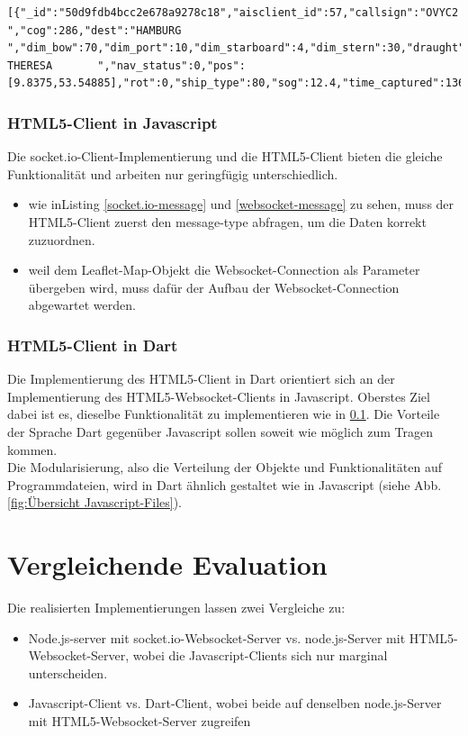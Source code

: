 \begin{lstlisting}[caption= vom socket.io-Server gesendete message, label=socket.io-message]
[{"_id":"50d9fdb4bcc2e678a9278c18","aisclient_id":57,"callsign":"OVYC2  ","cog":286,"dest":"HAMBURG             ","dim_bow":70,"dim_port":10,"dim_starboard":4,"dim_stern":30,"draught":54,"imo":"9363170","mmsi":220515000,"msgid":1,"name":"RIKKE THERESA       ","nav_status":0,"pos":[9.8375,53.54885],"rot":0,"ship_type":80,"sog":12.4,"time_captured":1366734056000,"time_received":1366734014715,"true_heading":288}]
\end{lstlisting}

\subsection{HTML5-Client in Javascript}\label{HTML5-Client in Javascript}
Die socket.io-Client-Implementierung und die HTML5-Client bieten die gleiche Funktionalität und arbeiten nur geringfügig unterschiedlich.
 \begin{itemize}
 \item wie inListing \ref{socket.io-message} und \ref{websocket-message} zu sehen, muss der HTML5-Client zuerst den message-type abfragen, um die Daten korrekt zuzuordnen.
 \item weil dem Leaflet-Map-Objekt die Websocket-Connection als Parameter übergeben wird, muss dafür der Aufbau der Websocket-Connection abgewartet werden. 
\end{itemize}

\subsection{HTML5-Client in Dart}\label{HTML5-Client in Dart}
Die Implementierung des HTML5-Client in Dart orientiert sich an der Implementierung des HTML5-Websocket-Clients in Javascript. Oberstes Ziel dabei ist es, dieselbe Funktionalität zu implementieren wie in \ref{HTML5-Client in Javascript}. Die Vorteile der Sprache Dart gegenüber Javascript sollen soweit wie möglich zum Tragen kommen. \\
Die Modularisierung, also die Verteilung der Objekte und Funktionalitäten auf Programmdateien, wird in Dart ähnlich gestaltet wie in Javascript (siehe Abb. \ref{fig:Übersicht Javascript-Files}).

\chapter{Vergleichende Evaluation}
Die realisierten Implementierungen lassen zwei Vergleiche zu: 
\begin{itemize}
\item Node.js-server mit socket.io-Websocket-Server vs. node.js-Server mit HTML5-Websocket-Server, wobei die Javascript-Clients sich nur marginal unterscheiden.
\item Javascript-Client vs. Dart-Client, wobei beide auf denselben node.js-Server mit HTML5-Websocket-Server zugreifen
\end{itemize}

